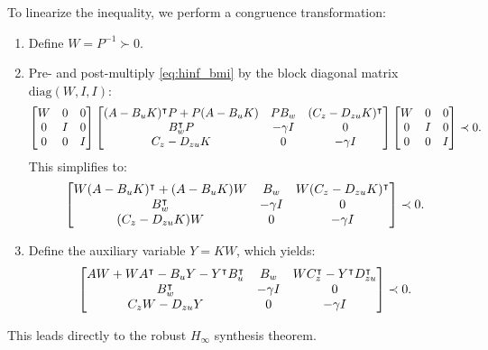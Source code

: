 To linearize the inequality, we perform a congruence transformation:
\begin{enumerate}
    \item Define $W = P^{-1} \succ 0$.
    \item Pre- and post-multiply \eqref{eq:hinf_bmi} by the block diagonal matrix $\text{diag}(W, I, I)$:
    \begin{equation}
\begin{bmatrix} W & 0 & 0 \\ 0 & I & 0 \\ 0 & 0 & I \end{bmatrix} \begin{bmatrix} (A - B_u K)^\intercal P + P (A - B_u K) & P B_w & (C_z - D_{zu} K)^\intercal \\ B_w^\intercal P & -\gamma I & 0 \\ C_z - D_{zu} K & 0 & -\gamma I \end{bmatrix} \begin{bmatrix} W & 0 & 0 \\ 0 & I & 0 \\ 0 & 0 & I \end{bmatrix} \prec 0 .
    \end{equation}
    This simplifies to:
    \begin{equation}
\begin{bmatrix} W (A - B_u K)^\intercal + (A - B_u K) W & B_w & W (C_z - D_{zu} K)^\intercal \\ B_w^\intercal & -\gamma I & 0 \\ (C_z - D_{zu} K) W & 0 & -\gamma I \end{bmatrix} \prec 0 .
    \end{equation}
    \item Define the auxiliary variable $Y = K W$, which yields:
    \begin{equation}
\begin{bmatrix} A W + W A^\intercal - B_u Y - Y^\intercal B_u^\intercal & B_w & W C_z^\intercal - Y^\intercal D_{zu}^\intercal \\ B_w^\intercal & -\gamma I & 0 \\ C_z W - D_{zu} Y & 0 & -\gamma I \end{bmatrix} \prec 0 .
    \end{equation}
\end{enumerate}

This leads directly to the robust $H_\infty$ synthesis theorem.

